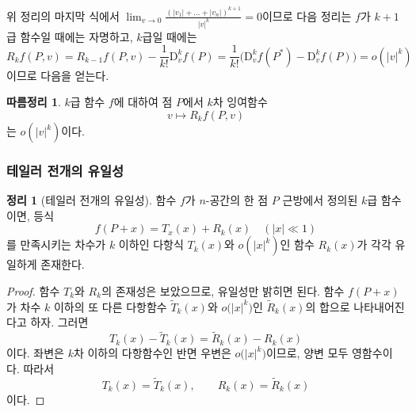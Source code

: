 \documentclass[unfonts,oneside,a4paper]{oblivoir}
\theoremstyle{definition}
\theoremstyle{theorem}
\newtheorem{theorem}{정리}[subsubsection]
\newtheorem{corollary}{따름정리}[subsubsection]
\renewcommand{\vec}[1]{\bm{\mathit{#1}}}
\newcommand{\vecz}{\bm{\mathrm{0}}}
\newcommand{\dD}{\mathrm{D}}
\begin{document}
위 정리의 마지막 식에서 $\lim_{\vec v \rightarrow \vecz} \frac{(|v_1| + \dots + |v_n|)^{k + 1}}{|\vec v|^k} = 0$이므로 다음 정리는 $f$가 $k + 1$급 함수일 때에는 자명하고, $k$급일 때에는
\begin{equation*}
    R_k f(P, \vec v) = R_{k - 1} f(P, \vec v) - \frac{1}{k!} \dD_{\vec v}^k f(P) = \frac{1}{k!} \bigl(\dD_{\vec v}^k f(P^*) - \dD_{\vec v}^k f(P)\bigr) = o(|\vec v|^k)
\end{equation*}
이므로 다음을 얻는다.

\begin{corollary}
    $k$급 함수 $f$에 대하여 점 $P$에서 $k$차 잉여함수
    \begin{equation*}
        \vec v \mapsto R_k f(P, \vec v)
    \end{equation*}
    는 $o(|\vec v|^k)$이다.
\end{corollary}

\subsubsection{테일러 전개의 유일성}

\begin{theorem}[테일러 전개의 유일성]
    함수 $f$가 $n$-공간의 한 점 $P$ 근방에서 정의된 $k$급 함수이면, 등식
    \begin{equation*}
        f(P + \vec x) = T_x (\vec x) + R_k (\vec x) \quad (|\vec x| \ll 1)
    \end{equation*}
    를 만족시키는 차수가 $k$ 이하인 다항식 $T_k(\vec x)$와 $o(|\vec x|^k)$인 함수 $R_k(\vec x)$가 각각 유일하게 존재한다.
\end{theorem}
\begin{proof}
    함수 $T_k$와 $R_k$의 존재성은 보았으므로, 유일성만 밝히면 된다.
    함수 $f(P + \vec x)$가 차수 $k$ 이하의 또 다른 다항함수 $\tilde T_k (\vec x)$와 $o\bigl( |\vec x|^k \bigr)$인 $\tilde R_k (\vec x)$의 합으로 나타내어진다고 하자.
    그러면
    \begin{equation*}
        T_k(\vec x) - \tilde T_k(\vec x) = \tilde R_k(\vec x) - R_k(\vec x)
    \end{equation*}
    이다.
    좌변은 $k$차 이하의 다항함수인 반면 우변은 $o\bigl( |\vec x|^k \bigr)$이므로, 양변 모두 영함수이다.
    따라서
    \begin{equation*}
        T_k(\vec x) = \tilde T_k(\vec x),\qquad R_k(\vec x) = \tilde R_k(\vec x)
    \end{equation*}
    이다.
\end{proof}
\end{document}
